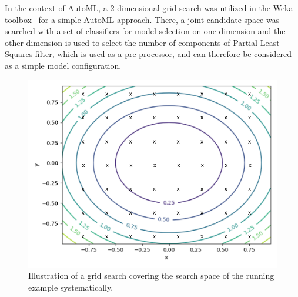 In the context of AutoML, a 2-dimensional grid search was utilized in the Weka toolbox~\cite{Witten-Weka} for a simple AutoML approach.
There, a joint candidate space was searched with a set of classifiers for model selection on one dimension and the other dimension is used to select the number of components of Partial Least Squares filter, which is used as a pre-processor, and can therefore be considered as a simple model configuration.
\begin{figure}[ht!]
    \centering
    \includegraphics[width=\textwidth]{gfx/Figures/Theory/GridSearch.pdf}
    \caption{Illustration of a grid search covering the search space of the running example systematically.}
    \label{fig:theory:grid-search}
\end{figure}


